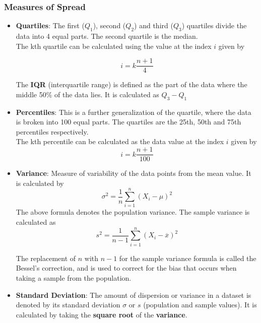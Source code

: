 \documentclass{article}
\theoremstyle{plain}
\theoremstyle{definition}
\begin{document}
\subsubsection{Measures of Spread}
\begin{itemize}
    \item \textbf{Quartiles}: The first ($Q_1$), second ($Q_2$) and third ($Q_3$) quartiles divide the data into 4 equal parts. The second quartile is the median.\\
    The kth quartile can be calculated using the value at the index $i$ given by
    
    \begin{equation}
        i = k \frac{n+1}{4}
    \end{equation}
    
    The \textbf{IQR} (interquartile range) is defined as the part of the data where the middle 50\% of the data lies. It is calculated as $Q_3 - Q_1$
    
    \item \textbf{Percentiles}: This is a further generalization of the quartile, where the data is broken into 100 equal parts. The quartiles are the 25th, 50th and 75th percentiles respectively.\\
    The kth percentile can be calculated as the data value at the index $i$ given by 
    \begin{equation}
        i = k \frac{n+1}{100}
    \end{equation}
    
    \item \textbf{Variance}: Measure of variability of the data points from the mean value.
    It is calculated by
    \begin{equation}
        \sigma^2 = \frac{1}{n}\sum_{i=1}^{n} (X_i - \mu)^2
    \end{equation}
    The above formula denotes the population variance. The sample variance is calculated as
    \begin{equation}
        s^2 = \frac{1}{n-1} \sum_{i=1}^{n} (X_i - \overline{x})^2
    \end{equation}
    
    The replacement of $n$ with $n-1$ for the sample variance formula is called the Bessel's correction, and is used to correct for the bias that occurs when taking a sample from the population. 
    
    \item \textbf{Standard Deviation}: The amount of dispersion or variance in a dataset is denoted by its standard deviation $\sigma$ or $s$ (population and sample values). 
    It is calculated by taking the \textbf{square root} of the \textbf{variance}. 
\end{itemize}
\end{document}
